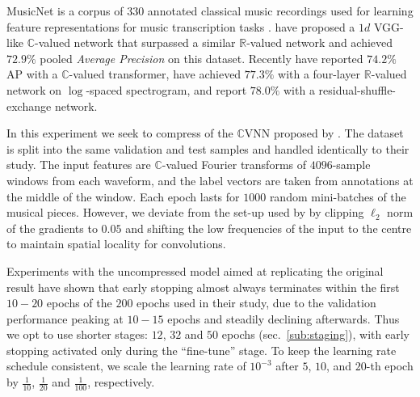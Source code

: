 \documentclass{article}
\newcommand{\real}{\mathbb{R}}
\newcommand{\cplx}{\mathbb{C}}
\begin{document}


MusicNet is a corpus of $330$ annotated classical music recordings used for learning
feature representations for music transcription tasks \citep{thickstun_learning_2017}.
\citet{trabelsi_deep_2018} have proposed a $1d$ VGG-like $\cplx$-valued network that
surpassed a similar $\real$-valued network and achieved $72.9\%$ pooled \emph{Average
Precision} on this dataset. Recently \citet{yang_complex_2020} have reported $74.2\%$
AP with a $\cplx$-valued transformer, \citet{thickstun_invariances_2018} have achieved
$77.3\%$ with a four-layer $\real$-valued network on $\log$-spaced spectrogram, and
\citet{draguns_residual_2020} report $78.0\%$ with a residual-shuffle-exchange network.

In this experiment we seek to compress of the $\cplx$VNN proposed by \citet{trabelsi_deep_2018}.
%
The dataset is split into the same validation and test samples and handled identically
to their study. The input features are $\cplx$-valued Fourier transforms of $4096$-sample
windows from each waveform, and the label vectors are taken from annotations at the middle
of the window. Each epoch lasts for $1000$ random mini-batches of the musical pieces.
% 
However, we deviate from the set-up used by \citet{trabelsi_deep_2018} by clipping $\ell_2$
norm of the gradients to $0.05$ and shifting the low frequencies of the input to the centre
to maintain spatial locality for convolutions.

Experiments with the uncompressed model aimed at replicating the original result have
shown that early stopping almost always terminates within the first $10-20$ epochs of
the $200$ epochs used in their study, due to the validation performance peaking at
$10-15$ epochs and steadily declining afterwards.
%
Thus we opt to use shorter stages: $12$, $32$ and $50$ epochs (sec.~\ref{sub:staging}),
with early stopping activated only during the ``fine-tune'' stage. To keep the learning
rate schedule consistent, we scale the learning rate of $10^{-3}$ after $5$, $10$, and
$20$-th epoch by $\tfrac1{10}$, $\tfrac1{20}$ and $\tfrac1{100}$, respectively.
\end{document}

